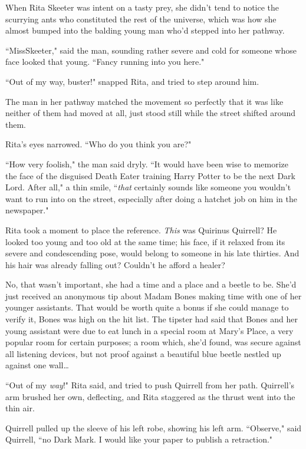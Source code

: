 
When Rita Skeeter was intent on a tasty prey, she didn't tend to notice the scurrying ants who constituted the rest of the universe, which was how she almost bumped into the balding young man who'd stepped into her pathway.

``Miss\?Skeeter," said the man, sounding rather severe and cold for someone whose face looked that young. ``Fancy running into you here."

``Out of my way, buster!" snapped Rita, and tried to step around him.

The man in her pathway matched the movement so perfectly that it was like neither of them had moved at all, just stood still while the street shifted around them.

Rita's eyes narrowed. ``Who do you think you are?"

``How very foolish," the man said dryly. ``It would have been wise to memorize the face of the disguised Death Eater training Harry Potter to be the next Dark Lord. After all," a thin smile, ``\emph{that} certainly sounds like someone you wouldn't want to run into on the street, especially after doing a hatchet job on him in the newspaper."

Rita took a moment to place the reference. \emph{This} was Quirinus Quirrell? He looked too young and too old at the same time; his face, if it relaxed from its severe and condescending pose, would belong to someone in his late thirties. And his hair was already falling out? Couldn't he afford a healer?

No, that wasn't important, she had a time and a place and a beetle to be. She'd just received an anonymous tip about Madam Bones making time with one of her younger assistants. That would be worth quite a bonus if she could manage to verify it, Bones was high on the hit list. The tipster had said that Bones and her young assistant were due to eat lunch in a special room at Mary's Place, a very popular room for certain purposes; a room which, she'd found, was secure against all listening devices, but not proof against a beautiful blue beetle nestled up against one wall{\ldots}

``Out of my \emph{way}!" Rita said, and tried to push Quirrell from her path. Quirrell's arm brushed her own, deflecting, and Rita staggered as the thrust went into the thin air.

Quirrell pulled up the sleeve of his left robe, showing his left arm. ``Observe," said Quirrell, ``no Dark Mark. I would like your paper to publish a retraction."

